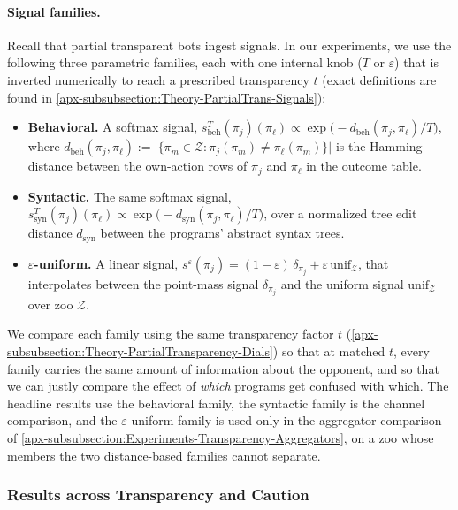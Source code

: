 \documentclass[twoside,11pt]{article}
\begin{document}
\paragraph{Signal families.} Recall that partial transparent bots ingest signals. In our experiments, we use the following three parametric families, each with one internal knob ($T$ or $\varepsilon$) that is inverted numerically to reach a prescribed transparency $t$ (exact definitions are found in \cref{apx-subsubsection:Theory-PartialTrans-Signals}):
\begin{itemize}
    \item \textbf{Behavioral.} A softmax signal, $s_{\mathrm{beh}}^T(\pi_j)(\pi_\ell) \propto \exp\bigl(-d_{\mathrm{beh}}(\pi_j,\pi_\ell)/T\bigr)$, where $d_{\mathrm{beh}}(\pi_j,\pi_\ell) := \bigl|\{\pi_m \in \mathcal{Z} : \pi_j(\pi_m) \neq \pi_\ell(\pi_m)\}\bigr|$ is the Hamming distance between the own-action rows of $\pi_j$ and $\pi_\ell$ in the outcome table.
    \item \textbf{Syntactic.} The same softmax signal, $s_{\mathrm{syn}}^T(\pi_j)(\pi_\ell) \propto \exp\bigl(-d_{\mathrm{syn}}(\pi_j,\pi_\ell)/T\bigr)$, over a normalized tree edit distance $d_{\mathrm{syn}}$ \citep{tree_signal_family} between the programs' abstract syntax trees.
    \item \textbf{$\varepsilon$-uniform.} A linear signal, $s^{\varepsilon}(\pi_j) = (1-\varepsilon)\,\delta_{\pi_j} + \varepsilon\,\mathrm{unif}_{\mathcal{Z}}$, that interpolates between the point-mass signal $\delta_{\pi_j}$ and the uniform signal $\mathrm{unif}_{\mathcal{Z}}$ over zoo $\mathcal{Z}$.
\end{itemize}
We compare each family using the same transparency factor $t$ (\cref{apx-subsubsection:Theory-PartialTransparency-Dials}) so that at matched $t$, every family carries the same amount of information about the opponent, and so that we can justly compare the effect of \emph{which} programs get confused with which. The headline results use the behavioral family, the syntactic family is the channel comparison, and the $\varepsilon$-uniform family is used only in the aggregator comparison of \cref{apx-subsubsection:Experiments-Transparency-Aggregators}, on a zoo whose members the two distance-based families cannot separate.

\subsubsection{Results across Transparency and Caution}
\label{subsection:Results-Transparency-Analysis}
\end{document}
